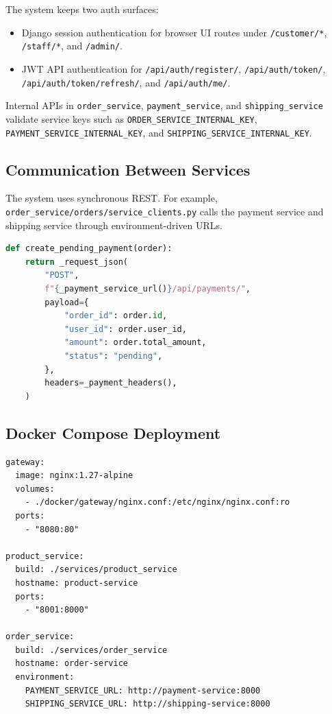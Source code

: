 \documentclass[12pt,a4paper]{article}
\newcommand{\codepath}[1]{{\small\texttt{#1}}}
\begin{document}
The system keeps two auth surfaces:

\begin{itemize}
    \item Django session authentication for browser UI routes under \codepath{/customer/*}, \codepath{/staff/*}, and \codepath{/admin/}.
    \item JWT API authentication for \codepath{/api/auth/register/}, \codepath{/api/auth/token/}, \codepath{/api/auth/token/refresh/}, and \codepath{/api/auth/me/}.
\end{itemize}

Internal APIs in \codepath{order\_service}, \codepath{payment\_service}, and \codepath{shipping\_service} validate service keys such as \codepath{ORDER\_SERVICE\_INTERNAL\_KEY}, \codepath{PAYMENT\_SERVICE\_INTERNAL\_KEY}, and \codepath{SHIPPING\_SERVICE\_INTERNAL\_KEY}.

\subsection{Communication Between Services}

The system uses synchronous REST. For example, \codepath{order\_service/orders/service\_clients.py} calls the payment service and shipping service through environment-driven URLs.

\begin{lstlisting}[language=Python,caption={Real internal service call pattern.}]
def create_pending_payment(order):
    return _request_json(
        "POST",
        f"{_payment_service_url()}/api/payments/",
        payload={
            "order_id": order.id,
            "user_id": order.user_id,
            "amount": order.total_amount,
            "status": "pending",
        },
        headers=_payment_headers(),
    )
\end{lstlisting}

\subsection{Docker Compose Deployment}

\begin{lstlisting}[caption={Real Docker Compose service excerpt.}]
gateway:
  image: nginx:1.27-alpine
  volumes:
    - ./docker/gateway/nginx.conf:/etc/nginx/nginx.conf:ro
  ports:
    - "8080:80"

product_service:
  build: ./services/product_service
  hostname: product-service
  ports:
    - "8001:8000"

order_service:
  build: ./services/order_service
  hostname: order-service
  environment:
    PAYMENT_SERVICE_URL: http://payment-service:8000
    SHIPPING_SERVICE_URL: http://shipping-service:8000
\end{lstlisting}
\end{document}
